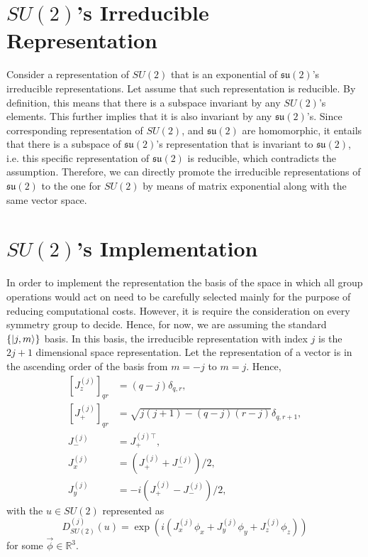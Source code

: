 \documentclass[12pt]{revtex4-2}
\begin{document}
\section{$SU(2)$'s Irreducible Representation}
Consider a representation of $SU(2)$ that is an exponential of $\mathfrak{su(2)}$'s irreducible representations. Let assume that such representation is reducible. By definition, this means that there is a subspace invariant by any $SU(2)$'s elements. This further implies that it is also invariant by any $\mathfrak{su(2)}$'s. Since corresponding representation of $SU(2)$, and $\mathfrak{su(2)}$ are homomorphic, it entails that there is a subspace of $\mathfrak{su(2)}$'s representation that is invariant to $\mathfrak{su(2)}$, i.e. this specific representation of $\mathfrak{su(2)}$ is reducible, which contradicts the assumption. Therefore, we can directly promote the irreducible representations of $\mathfrak{su(2)}$ to the one for $SU(2)$ by means of matrix exponential along with the same vector space.

\section{$SU(2)$'s Implementation}
In order to implement the representation the basis of the space in which all group operations would act on need to be carefully selected mainly for the purpose of reducing computational costs. However, it is require the consideration on every symmetry group to decide. Hence, for now, we are assuming the standard $\{\ket{j, m}\}$ basis. In this basis, the irreducible representation with index $j$ is the $2j+1$ dimensional space representation. Let the representation of a vector is in the ascending order of the basis from $m = -j$ to $m = j$. Hence,
\begin{equation}
    \begin{aligned}
        \left[J_z^{(j)}\right]_{qr} &= (q-j)\delta_{q,r}, \\
        \left[J_+^{(j)}\right]_{qr} &= \sqrt{j(j+1)-(q-j)(r-j)}\delta_{q,r+1}, \\
        J_-^{(j)} &= J_+^{(j)\top}, \\
        J_x^{(j)} &= \left(J_+^{(j)}+J_-^{(j)}\right)/2, \\
        J_y^{(j)} &= -i\left(J_+^{(j)}-J_-^{(j)}\right)/2,
    \end{aligned}
\end{equation}
with the $u\in SU(2)$ represented as
\begin{equation}
    D^{(j)}_{SU(2)}(u) = \exp(i(J_x^{(j)}\phi_x+J_y^{(j)}\phi_y+J_z^{(j)}\phi_z))
\end{equation}
for some $\vec{\phi}\in\mathbb{R}^3$.
\end{document}
